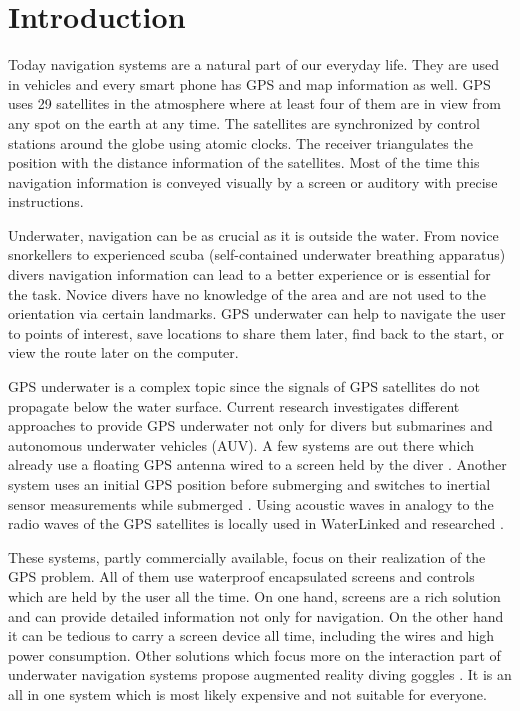 %

\chapter{Introduction}
\label{introduction}

Today navigation systems are a natural part of our everyday life.
They are used in vehicles and every smart phone has GPS and map information as well.
GPS uses 29 satellites in the atmosphere where at least four of them are in view from any spot on the earth at any time.
The satellites are synchronized by control stations around the globe using atomic clocks.
The receiver triangulates the position with the distance information of the satellites.
Most of the time this navigation information is conveyed visually by a screen or auditory with precise instructions.

Underwater, navigation can be as crucial as it is outside the water.
From novice snorkellers to experienced scuba (self-contained underwater breathing apparatus) divers navigation information can lead to a better experience or is essential for the task.
Novice divers have no knowledge of the area and are not used to the orientation via certain landmarks.
GPS underwater can help to navigate the user to points of interest, save locations to share them later, find back to the start, or view  the route later on the computer. 

GPS underwater is a complex topic since the signals of GPS satellites do not propagate below the water surface.
Current research investigates different approaches to provide GPS underwater not only for divers but submarines and autonomous underwater vehicles (AUV).
A few systems are out there which already use a floating GPS antenna wired to a screen held by the diver \citep{navdive}.
Another system uses an initial GPS position before submerging and switches to inertial sensor measurements while submerged \citep{ariadna}.
Using acoustic waves in analogy to the radio waves of the GPS satellites is locally used in WaterLinked \citep{waterlinked} and researched \citep{Taraldsen_UnderwaterGPS}.

These systems, partly commercially available, focus on their realization of the GPS problem.
All of them use waterproof encapsulated screens and controls which are held by the user all the time.
On one hand, screens are a rich solution and can provide detailed information not only for navigation.
On the other hand it can be tedious to carry a screen device all time, including the wires and high power consumption.
Other solutions which focus more on the interaction part of underwater navigation systems propose augmented reality diving goggles \citep{scubus}.
It is an all in one system which is most likely expensive and not suitable for everyone.

